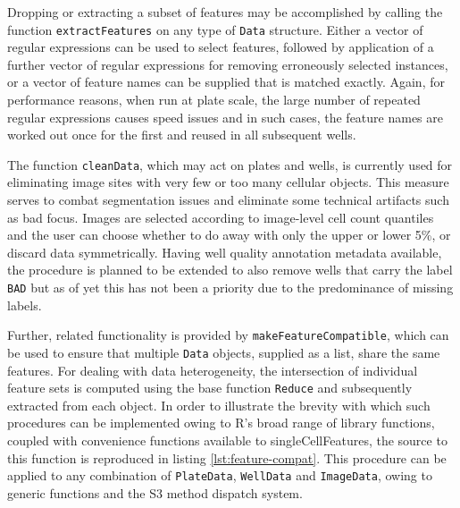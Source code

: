 Dropping or extracting a subset of features may be accomplished by calling the function \texttt{extractFeatures} on any type of \texttt{Data} structure. Either a vector of regular expressions can be used to select features, followed by application of a further vector of regular expressions for removing erroneously selected instances, or a vector of feature names can be supplied that is matched exactly. Again, for performance reasons, when run at plate scale, the large number of repeated regular expressions causes speed issues and in such cases, the feature names are worked out once for the first and reused in all subsequent wells.

The function \texttt{cleanData}, which may act on plates and wells, is currently used for eliminating image sites with very few or too many cellular objects. This measure serves to combat segmentation issues and eliminate some technical artifacts such as bad focus. Images are selected according to image-level cell count quantiles and the user can choose whether to do away with only the upper or lower 5\%, or discard data symmetrically. Having well quality annotation metadata available, the procedure is planned to be extended to also remove wells that carry the label \texttt{BAD} but as of yet this has not been a priority due to the predominance of missing labels.

Further, related functionality is provided by \texttt{makeFeatureCompatible}, which can be used to ensure that multiple \texttt{Data} objects, supplied as a list, share the same features. For dealing with data heterogeneity, the intersection of individual feature sets is computed using the base function \texttt{Reduce} and subsequently extracted from each object. In order to illustrate the brevity with which such procedures can be implemented owing to R's broad range of library functions, coupled with convenience functions available to singleCellFeatures, the source to this function is reproduced in listing \ref{lst:feature-compat}. This procedure can be applied to any combination of \texttt{PlateData}, \texttt{WellData} and \texttt{ImageData}, owing to generic functions and the S3 method dispatch system.


